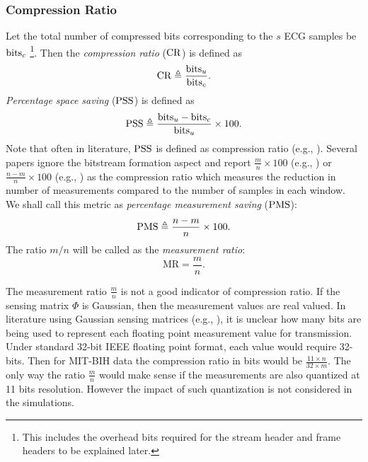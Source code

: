 \subsubsection{Compression Ratio}
Let the total number of compressed
bits corresponding to the $s$ ECG samples be
$\mathrm{bits}_c$ \footnote{This includes the overhead bits required
for the stream header and frame headers to be explained later.}.
Then the \emph{compression ratio} ($\mathrm{CR}$) is defined as
\begin{equation}
\mathrm{CR} \triangleq \frac{\mathrm{bits}_u}{\mathrm{bits}_c}.
\end{equation}
\emph{Percentage space saving} ($\mathrm{PSS}$) is defined as
\begin{equation}
\mathrm{PSS} \triangleq \frac{\mathrm{bits}_u - \mathrm{bits}_c}{\mathrm{bits}_u} \times 100.
\end{equation}
Note that often in literature, $\mathrm{PSS}$ is defined as compression ratio
(e.g., \cite{mamaghanian2011compressed}).
Several papers ignore the bitstream formation aspect
and report $\frac{m}{n} \times 100$
(e.g., \cite{zhang2016comparison})
or $\frac{n - m}{n} \times 100$ (e.g., \cite{zhang2021csnet})
as the compression ratio
which measures the reduction in number of measurements
compared to the number of samples in each window.
We shall call this metric as \emph{percentage measurement
saving} ($\mathrm{PMS}$):
\begin{equation}
\mathrm{PMS} \triangleq \frac{n - m}{n} \times 100.
\end{equation}
The ratio $m/n$ will be called as the \emph{measurement ratio}:
\begin{equation}
\mathrm{MR}= \frac{m}{n}.
\end{equation}

The measurement ratio $\frac{m}{n}$ is not a
good indicator of compression ratio.
If the sensing matrix $\Phi$ is Gaussian,
then the measurement values are real valued.
In literature using Gaussian sensing matrices
(e.g., \cite{zhang2016comparison}),
it is unclear how many bits are
being used to represent each floating point measurement value
for transmission.
Under standard 32-bit IEEE floating point format,
each value would require 32-bits.
Then for MIT-BIH data the compression ratio in bits
would be $\frac{11 \times n}{32 \times m}$.
The only way the ratio $\frac{m}{n}$ would make sense
if the measurements are also quantized at 11 bits
resolution. However the impact of such quantization
is not considered in the simulations.

